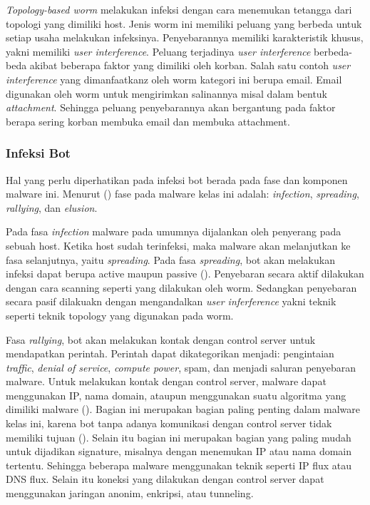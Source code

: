 \textit{Topology-based worm} melakukan infeksi dengan cara menemukan tetangga dari topologi yang dimiliki host. Jenis worm ini memiliki peluang yang berbeda untuk setiap usaha melakukan infeksinya. Penyebarannya memiliki karakteristik khusus, yakni memiliki \textit{user interference}. Peluang terjadinya \textit{user interference} berbeda-beda akibat beberapa faktor yang dimiliki oleh korban. Salah satu contoh \textit{user interference} yang dimanfaatkanz oleh worm kategori ini berupa email. Email digunakan oleh worm untuk mengirimkan salinannya misal dalam bentuk \textit{attachment}. Sehingga peluang penyebarannya akan bergantung pada faktor berapa sering korban membuka email dan membuka attachment.

\subsubsection{Infeksi Bot}

Hal yang perlu diperhatikan pada infeksi bot berada pada fase dan komponen malware ini. Menurut (\cite{alsamer2016}) fase pada malware kelas ini adalah: \textit{infection}, \textit{spreading}, \textit{rallying}, dan \textit{elusion}.

Pada fasa \textit{infection} malware pada umumnya dijalankan oleh penyerang pada sebuah host. Ketika host sudah terinfeksi, maka malware akan melanjutkan ke fasa selanjutnya, yaitu \textit{spreading}. Pada fasa \textit{spreading}, bot akan melakukan infeksi dapat berupa active maupun passive (\cite{alsamer2016}). Penyebaran secara aktif dilakukan dengan cara scanning seperti yang dilakukan oleh worm. Sedangkan penyebaran secara pasif dilakuakn dengan mengandalkan \textit{user inferference} yakni teknik seperti teknik topology yang digunakan pada worm.

Fasa \textit{rallying}, bot akan melakukan kontak dengan control server untuk mendapatkan perintah. Perintah dapat dikategorikan menjadi: pengintaian \textit{traffic}, \textit{denial of service}, \textit{compute power}, spam, dan menjadi saluran penyebaran malware. Untuk melakukan kontak dengan control server, malware dapat menggunakan IP, nama domain, ataupun menggunakan suatu algoritma yang dimiliki malware (\cite{alsamer2016}). Bagian ini merupakan bagian paling penting dalam malware kelas ini, karena bot tanpa adanya komunikasi dengan control server tidak memiliki tujuan (\cite{alsamer2016}). Selain itu bagian ini merupakan bagian yang paling mudah untuk dijadikan signature, misalnya dengan menemukan IP atau nama domain tertentu. Sehingga beberapa malware menggunakan teknik seperti IP flux atau DNS flux. Selain itu koneksi yang dilakukan dengan control server dapat menggunakan jaringan anonim, enkripsi, atau tunneling. 

